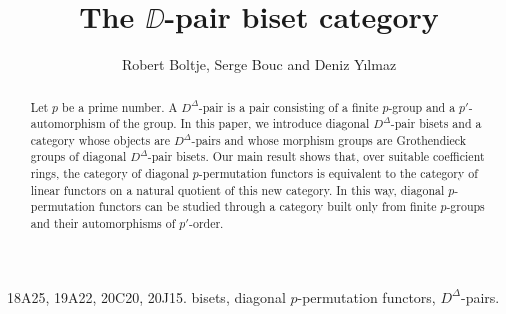 \documentclass[11pt]{article}
\title{The $\DD$-pair biset category}
\author{Robert Boltje, Serge Bouc and Deniz Y\i lmaz}
\date{}
\theoremstyle{change}  %
\newcommand{\DD}{D^{\Delta}}
\begin{document}
\sloppy
\maketitle

\begin{abstract} 

	Let $p$ be a prime number. A $\DD$-pair is a pair consisting of a finite $p$-group and a $p'$-automorphism of the group. In this paper, we introduce diagonal $\DD$-pair bisets and a category whose objects are $\DD$-pairs and whose morphism groups are Grothendieck groups of diagonal $\DD$-pair bisets. Our main result shows that, over suitable coefficient rings, the category of diagonal $p$-permutation functors is equivalent to the category of linear functors on a natural quotient of this new category. In this way, diagonal $p$-permutation functors can be studied through a category built only from finite $p$-groups and their automorphisms of $p'$-order.
\end{abstract}

{} 18A25, 19A22, 20C20, 20J15. 
{} bisets, diagonal $p$-permutation functors, $\DD$-pairs.
\end{document}

